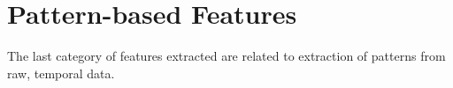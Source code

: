 \section{Pattern-based Features}
\label{sec:weatherfeatures}

The last category of features extracted are related to extraction of patterns from raw, temporal data.
